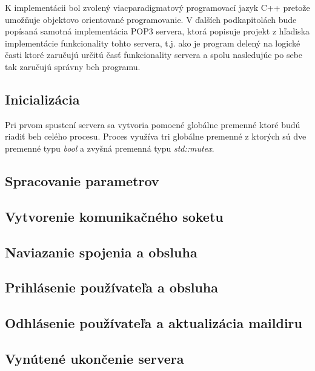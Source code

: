 \documentclass[11pt,a4paper]{article}
\begin{document}
	K implementácii bol zvolený viacparadigmatový programovací jazyk C++ pretože umožňuje objektovo orientované programovanie. V ďalších podkapitolách bude popísaná samotná implementácia POP3 servera, ktorá popisuje projekt z hľadiska implementácie funkcionality tohto servera, t.j. ako je program delený na logické časti ktoré zaručujú určitú časť funkcionality servera a spolu nasledujúc po sebe tak zaručujú správny beh programu.

	\subsection{Inicializácia}
		Pri prvom spustení servera sa vytvoria pomocné globálne premenné ktoré budú riadiť beh celého procesu. Proces využíva tri globálne premenné z ktorých sú dve premenné typu \textit{bool} a zvyšná premenná typu \textit{std::mutex}.

	\subsection{Spracovanie parametrov}
	\subsection{Vytvorenie komunikačného soketu}
	\subsection{Naviazanie spojenia a obsluha}
	\subsection{Prihlásenie používateľa a obsluha}
	\subsection{Odhlásenie používateľa a aktualizácia maildiru}
	\subsection{Vynútené ukončenie servera}
\end{document}
